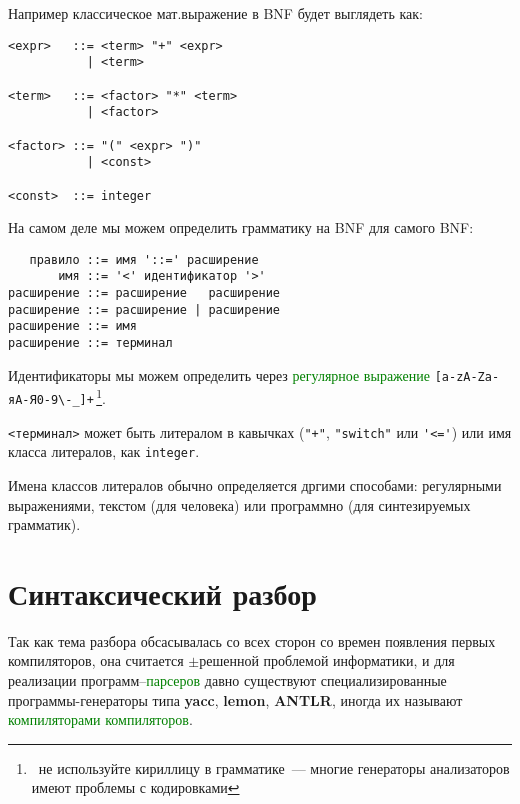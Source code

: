 \documentclass[oneside,10pt]{article}
\newcommand{\note}[1]{\,\footnote{\ #1}}
\newcommand{\term}[1]{\textcolor{green}{#1}}
\newcommand{\prog}[1]{\textbf{#1}}
\begin{document}
Например классическое мат.выражение в BNF будет выглядеть как:
\begin{verbatim}
<expr>   ::= <term> "+" <expr>
           | <term>

<term>   ::= <factor> "*" <term>
           | <factor>

<factor> ::= "(" <expr> ")"
           | <const>

<const>  ::= integer
\end{verbatim}

\pagebreak
На самом деле мы можем определить грамматику на BNF для самого BNF:
\begin{verbatim}
   правило ::= имя '::=' расширение
       имя ::= '<' идентификатор '>'
расширение ::= расширение   расширение
расширение ::= расширение | расширение
расширение ::= имя
расширение ::= терминал
\end{verbatim}

Идентификаторы мы можем определить через \term{регулярное выражение}
\verb|[a-zA-Zа-яА-Я0-9\-_]+|\note{не используйте кириллицу в грамматике\ ---
многие генераторы анализаторов имеют проблемы с кодировками}.

\verb|<терминал>| может быть литералом в кавычках (\verb|"+"|, \verb|"switch"|
или \verb|'<='|) или имя класса литералов, как \verb|integer|.

Имена классов литералов обычно определяется дргими способами: регулярными
выражениями, текстом (для человека) или программно (для синтезируемых
грамматик).

\clearpage
\section{Синтаксический разбор}

Так как тема разбора обсасывалась со всех сторон со времен появления первых
компиляторов, она считается $\pm$решенной проблемой информатики, и для
реализации программ--\term{парсеров} давно существуют специализированные
программы-генераторы типа \prog{yacc}, \prog{lemon}, \prog{ANTLR}, иногда их
называют \term{компиляторами компиляторов}.

% 
% 
\end{document}
